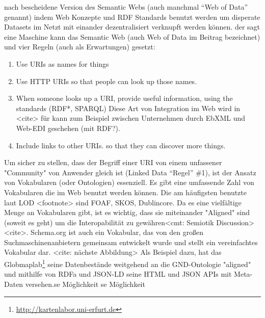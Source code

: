 nach \citeauthor[S.~61]{dewilde2015information} bescheidene Version des Semantic Webs (auch manchmal \hyphenquote{german}{Web of Data} genannt) indem Web Konzepte und RDF Standards benutzt werden um disperate Datasets im Netzt mit einander dezentralisiert verknupft werden können.  der sagt eine Maschine kann das Semantic Web (auch Web of Data im Beitrag bezeichnet) und vier Regeln (auch als Erwartungen) gesetzt: 

\begin{enumerate}
	\item Use URIs as names for things
	\item Use HTTP URIs so that people can look up those names.
	\item When someone looks up a URI, provide useful information, using the standards (RDF*, SPARQL) Diese Art von Integration im Web wird in <cite> für kann zum Beispiel zwischen Unternehmen durch EbXML und Web-EDI geschehen (mit RDF?).
	\item Include links to other URIs. so that they can discover more things.
\end{enumerate}

Um sicher zu stellen, dass der Begriff einer URI von einem unfassener "Community" von Anwender gleich ist (Linked Data \hyphenquote{german}{Regel} \#1), ist der Ansatz von Vokabularen (oder Ontologien) essenziell. Es gibt eine umfassende Zahl von Vokabularen die im Web benutzt werden können. Die am häufigsten benutzte laut LOD <footnote> sind FOAF, SKOS, Dublincore. Da es eine vielfältige Menge an Vokabularen gibt, ist es wichtig, dass sie miteinander "Aligned" sind (soweit es geht) um die Interopabilität zu gewähren<cmt: Semiotik Discussion> <cite>. Schema.org ist auch ein Vokabular, das von den großen Suchmaschinenanbietern gemeinsam entwickelt wurde und stellt ein vereinfachtes Vokabular dar. <cite: nächste Abbildung> Als Beispiel dazu, hat das Globmaplab\footnote{\url{http://kartenlabor.uni-erfurt.de}} seine Datenbestände weitgehend an die GND-Ontologie "aligned" und mithilfe von RDFa und JSON-LD seine HTML und JSON APIs mit Meta-Daten versehen.se Möglichkeit 
se Möglichkeit 




